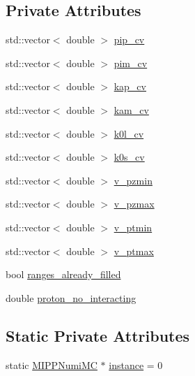 \subsection*{Private Attributes}
\begin{DoxyCompactItemize}
\item 
std\-::vector$<$ double $>$ \hyperlink{class_neutrino_flux_reweight_1_1_m_i_p_p_numi_m_c_ad6ca50dd6ef1c900ff6f0b53858a13fe}{pip\-\_\-cv}
\item 
std\-::vector$<$ double $>$ \hyperlink{class_neutrino_flux_reweight_1_1_m_i_p_p_numi_m_c_a8aad49a86d53b5188e5287d850b9852d}{pim\-\_\-cv}
\item 
std\-::vector$<$ double $>$ \hyperlink{class_neutrino_flux_reweight_1_1_m_i_p_p_numi_m_c_afe6fc64f94bb6f2ded77ea88aee784aa}{kap\-\_\-cv}
\item 
std\-::vector$<$ double $>$ \hyperlink{class_neutrino_flux_reweight_1_1_m_i_p_p_numi_m_c_a14a3f0aca4c12ee25194fea6bda18a43}{kam\-\_\-cv}
\item 
std\-::vector$<$ double $>$ \hyperlink{class_neutrino_flux_reweight_1_1_m_i_p_p_numi_m_c_a5bca60d2733426f0f113f9be6035cef4}{k0l\-\_\-cv}
\item 
std\-::vector$<$ double $>$ \hyperlink{class_neutrino_flux_reweight_1_1_m_i_p_p_numi_m_c_ac9c4d06a4bcf4856097b787bffc12251}{k0s\-\_\-cv}
\item 
std\-::vector$<$ double $>$ \hyperlink{class_neutrino_flux_reweight_1_1_m_i_p_p_numi_m_c_af6796ed5716ee06589ab1ba6e09fcd82}{v\-\_\-pzmin}
\item 
std\-::vector$<$ double $>$ \hyperlink{class_neutrino_flux_reweight_1_1_m_i_p_p_numi_m_c_ac4e9e478e2456cd112522650850b507c}{v\-\_\-pzmax}
\item 
std\-::vector$<$ double $>$ \hyperlink{class_neutrino_flux_reweight_1_1_m_i_p_p_numi_m_c_a105e858db8bf5e6b94a69b196815d98a}{v\-\_\-ptmin}
\item 
std\-::vector$<$ double $>$ \hyperlink{class_neutrino_flux_reweight_1_1_m_i_p_p_numi_m_c_afab2e17efd7d42565f3e1c8a84064349}{v\-\_\-ptmax}
\item 
bool \hyperlink{class_neutrino_flux_reweight_1_1_m_i_p_p_numi_m_c_a13918556257e6e07eb9c83cb9c029a94}{ranges\-\_\-already\-\_\-filled}
\item 
double \hyperlink{class_neutrino_flux_reweight_1_1_m_i_p_p_numi_m_c_a0bfecac140ed67cc0ad2d884dfb3333e}{proton\-\_\-no\-\_\-interacting}
\end{DoxyCompactItemize}
\subsection*{Static Private Attributes}
\begin{DoxyCompactItemize}
\item 
static \hyperlink{class_neutrino_flux_reweight_1_1_m_i_p_p_numi_m_c}{M\-I\-P\-P\-Numi\-M\-C} $\ast$ \hyperlink{class_neutrino_flux_reweight_1_1_m_i_p_p_numi_m_c_a1f5a2a2f7f56628ea47b681f5a954c3f}{instance} = 0
\end{DoxyCompactItemize}


